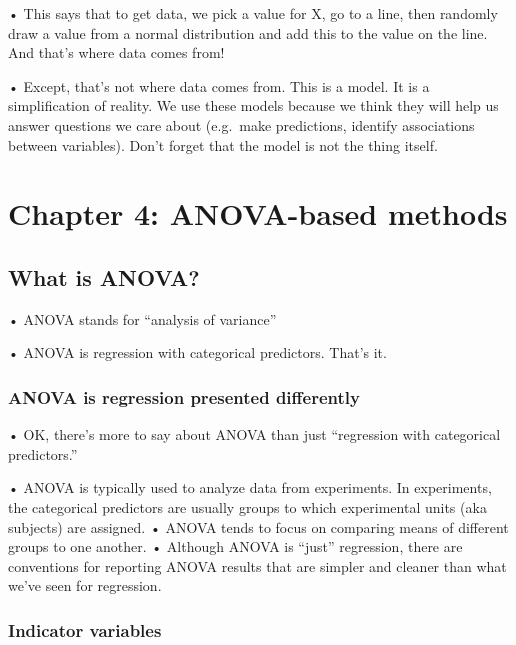 \documentclass[
  letterpaper,
  DIV=11,
  numbers=noendperiod]{scrreprt}
\begin{document}
• This says that to get data, we pick a value for X, go to a line, then
randomly draw a value from a normal distribution and add this to the
value on the line. And that's where data comes from!

• Except, that's not where data comes from. This is a model. It is a
simplification of reality. We use these models because we think they
will help us answer questions we care about (e.g.~make predictions,
identify associations between variables). Don't forget that the model is
not the thing itself.


\hypertarget{chapter-4-anova-based-methods}{%
\chapter{Chapter 4: ANOVA-based
methods}\label{chapter-4-anova-based-methods}}

\hypertarget{what-is-anova}{%
\section{What is ANOVA?}\label{what-is-anova}}

• ANOVA stands for ``analysis of variance''

• ANOVA is regression with categorical predictors. That's it.

\hypertarget{anova-is-regression-presented-differently}{%
\subsection{ANOVA is regression presented
differently}\label{anova-is-regression-presented-differently}}

• OK, there's more to say about ANOVA than just ``regression with
categorical predictors.''

• ANOVA is typically used to analyze data from experiments. In
experiments, the categorical predictors are usually groups to which
experimental units (aka subjects) are assigned. • ANOVA tends to focus
on comparing means of different groups to one another. • Although ANOVA
is ``just'' regression, there are conventions for reporting ANOVA
results that are simpler and cleaner than what we've seen for
regression.

\hypertarget{indicator-variables}{%
\subsection{Indicator variables}\label{indicator-variables}}
\end{document}
